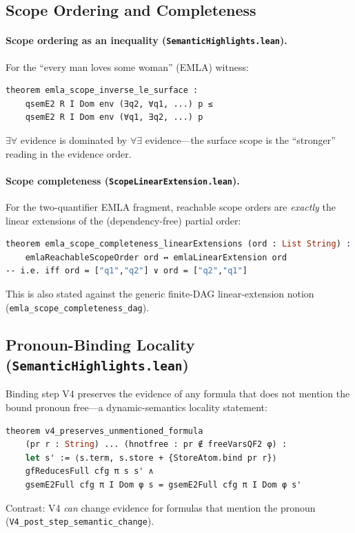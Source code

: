 \documentclass[11pt]{article}
\newcommand{\code}[1]{\texttt{#1}}
\begin{document}
\subsection{Scope Ordering and Completeness}

\paragraph{Scope ordering as an inequality (\code{SemanticHighlights.lean}).}
For the ``every man loves some woman'' (EMLA) witness:
\begin{lstlisting}[language=ml]
theorem emla_scope_inverse_le_surface :
    qsemE2 R I Dom env (∃q2, ∀q1, ...) p ≤
    qsemE2 R I Dom env (∀q1, ∃q2, ...) p
\end{lstlisting}
$\exists\forall$ evidence is dominated by $\forall\exists$ evidence---the
surface scope is the ``stronger'' reading in the evidence order.

\paragraph{Scope completeness (\code{ScopeLinearExtension.lean}).}
For the two-quantifier EMLA fragment, reachable scope orders are
\emph{exactly} the linear extensions of the (dependency-free) partial order:
\begin{lstlisting}[language=ml]
theorem emla_scope_completeness_linearExtensions (ord : List String) :
    emlaReachableScopeOrder ord ↔ emlaLinearExtension ord
-- i.e. iff ord = ["q1","q2"] ∨ ord = ["q2","q1"]
\end{lstlisting}
This is also stated against the generic finite-DAG linear-extension notion
(\code{emla\_scope\_completeness\_dag}).

\subsection{Pronoun-Binding Locality (\code{SemanticHighlights.lean})}

Binding step V4 preserves the evidence of any formula that does not
mention the bound pronoun free---a dynamic-semantics locality statement:
\begin{lstlisting}[language=ml]
theorem v4_preserves_unmentioned_formula
    (pr r : String) ... (hnotfree : pr ∉ freeVarsQF2 φ) :
    let s' := ⟨s.term, s.store + {StoreAtom.bind pr r}⟩
    gfReducesFull cfg π s s' ∧
    gsemE2Full cfg π I Dom φ s = gsemE2Full cfg π I Dom φ s'
\end{lstlisting}
Contrast: V4 \emph{can} change evidence for formulas that mention the pronoun
(\code{V4\_post\_step\_semantic\_change}).
\end{document}
